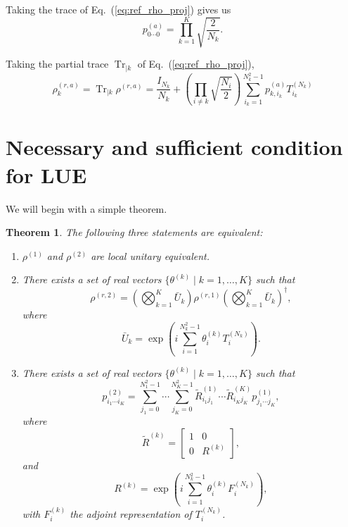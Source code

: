 \documentclass{article}
\DeclareMathOperator{\Tr}{Tr}
\newtheorem{theorem}{Theorem}
\begin{document}
Taking the trace of Eq.~(\ref{eq:ref_rho_proj}) gives us
\begin{equation}
  p^{(a)}_{0\cdots0} = \prod_{k=1}^K\sqrt{\frac{2}{N_k}}.
\end{equation}

Taking the partial trace $\Tr_{|k}$ of Eq.~(\ref{eq:ref_rho_proj}),
\begin{equation}
  \rho^{(r,a)}_k = \Tr_{|k}\rho^{(r,a)} = \frac{I_{N_k}}{N_k}
  + \left(\prod_{i\ne k}\sqrt{\frac{N_i}2}\right)\sum_{i_k=1}^{N_k^2-1}p^{(a)}_{k,i_k}T^{(N_k)}_{i_k}
\end{equation}

\section{Necessary and sufficient condition for LUE}
\label{sec:lue}
We will begin with a simple theorem.
\begin{theorem}
  \label{thm:lue}
  The following three statements are equivalent:
  \begin{enumerate}[label=\textbf{S.\arabic*}]
  \item \label{thm_stm_rho_lue} $\rho^{(1)}$ and $\rho^{(2)}$ are local unitary equivalent.
  \item \label{thm_stm_ubar} There exists a set of real vectors
    $\{\theta^{(k)}\mid k = 1,\ldots,K\}$ such that
    \begin{equation}
      \label{eq:ref_rho_lue}
      \rho^{(r,2)} = \left(\bigotimes_{k=1}^K \bar U_k\right)
      \rho^{(r,1)}
      \left(\bigotimes_{k=1}^K \bar U_k\right)^\dagger,
    \end{equation}
    where
    \begin{equation}
      \label{eq:ubar_k_exp_map}
      \bar U_k = \exp\left(i\sum_{i=1}^{N_k^2-1}\theta^{(k)}_iT^{(N_k)}_i\right).
    \end{equation}
  \item \label{thm_stm_R} There exists a set of real vectors
    $\{\theta^{(k)}\mid k = 1,\ldots,K\}$ such that
    \begin{equation}
      p^{(2)}_{i_1\cdots i_K} = \sum_{j_1=0}^{N_1^2-1}\cdots\sum_{j_K=0}^{N_K^2-1}
      \tilde R^{(1)}_{i_1j_1}\cdots\tilde R^{(K)}_{i_Kj_K}
      p^{(1)}_{j_1\cdots j_K},
    \end{equation}
    where
    \begin{equation}
      \label{eq:tilde_R_k}
      \tilde R^{(k)} = \begin{bmatrix}1 & 0 \\
        0 & R^{(k)}
        \end{bmatrix},
    \end{equation}
    and
    \begin{equation}
      \label{eq:R_k}
      R^{(k)} = \exp\left(i\sum_{i=1}^{N_k^2-1}\theta^{(k)}_iF^{(N_k)}_i\right),
    \end{equation}
    with $F^{(k)}_i$ the adjoint representation of $T^{(N_k)}_i$.
  \end{enumerate}
\end{theorem}
\end{document}
